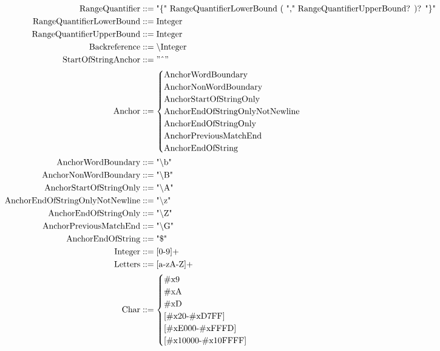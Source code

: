 \documentclass{article}
\begin{document}
\begin{align*}
		\text{RangeQuantifier} 		&::= \text{"\{" RangeQuantifierLowerBound ( "," RangeQuantifierUpperBound? )? "\}"} \\
		\text{RangeQuantifierLowerBound} &::= \text{Integer} \\
		\text{RangeQuantifierUpperBound} &::= \text{Integer} \\
		\text{Backreference} 		&::= \text{\textbackslash Integer} \\
		\text{StartOfStringAnchor}  &::= "\char`\^" \\
		\text{Anchor} 				&::= \begin{cases}
											\text{AnchorWordBoundary} \\
											\text{AnchorNonWordBoundary} \\
											\text{AnchorStartOfStringOnly} \\
											\text{AnchorEndOfStringOnlyNotNewline} \\
											\text{AnchorEndOfStringOnly} \\
											\text{AnchorPreviousMatchEnd} \\
											\text{AnchorEndOfString}
										\end{cases} \\
		\text{AnchorWordBoundary} &::= \text{"\textbackslash b"} \\
		\text{AnchorNonWordBoundary} &::= \text{"\textbackslash B"} \\
		\text{AnchorStartOfStringOnly} &::= \text{"\textbackslash A"} \\
		\text{AnchorEndOfStringOnlyNotNewline} &::= \text{"\textbackslash z"} \\
		\text{AnchorEndOfStringOnly} &::= \text{"\textbackslash Z"} \\
		\text{AnchorPreviousMatchEnd} &::= \text{"\textbackslash G"} \\
		\text{AnchorEndOfString} &::= \text{"\$"} \\
		\text{Integer} &::= \text{[0-9]+} \\
		\text{Letters} &::= \text{[a-zA-Z]+} \\
		\text{Char} &::= \begin{cases}
							\text{\#x9} \\
							\text{\#xA} \\			
							\text{\#xD} \\
							\text{[\#x20-\#xD7FF]} \\
							\text{[\#xE000-\#xFFFD]} \\
							\text{[\#x10000-\#x10FFFF]}
						\end{cases}
	\end{align*}
\end{document}
